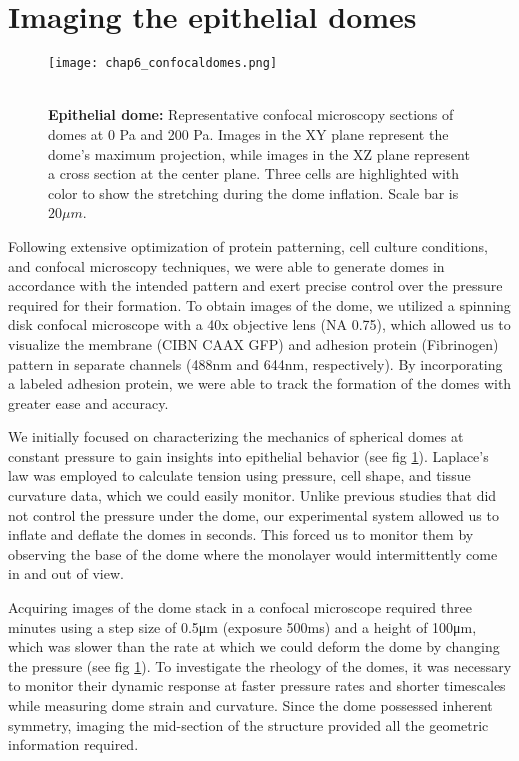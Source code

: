 \hypertarget{imaging-the-epithelial-domes}{%
\section{Imaging the epithelial
domes}\label{imaging-the-epithelial-domes}}

\begin{figure}[b!]
	\centering
	\texttt{[image: chap6\_confocaldomes.png]}
	\caption{\\ \textbf{Epithelial dome:} Representative confocal microscopy sections of domes at 0 Pa and 200 Pa. Images in the XY plane represent the dome's maximum projection, while images in the XZ plane represent a cross section at the center plane. Three cells are highlighted with color to show the stretching during the dome inflation. Scale bar is $20 \mu m$.
	} \label{fig_6_6}
\end{figure}

Following extensive optimization of protein patterning, cell culture conditions, and confocal microscopy techniques, we were able to generate domes in accordance with the intended pattern and exert precise control over the pressure required for their formation. To obtain images of the dome, we utilized a spinning disk confocal microscope with a 40x objective lens (NA 0.75), which allowed us to visualize the membrane (CIBN CAAX GFP) and adhesion protein (Fibrinogen) pattern in separate channels (488\unit{\nm} and 644\unit{\nm}, respectively). By incorporating a labeled adhesion protein, we were able to track the formation of the domes with greater ease and accuracy.

We initially focused on characterizing the mechanics of spherical domes at constant pressure to gain insights into epithelial behavior (see fig \ref{fig_6_6}). Laplace's law was employed to calculate tension using pressure, cell shape, and tissue curvature data, which we could easily monitor. Unlike previous studies that did not control the pressure under the dome, our experimental system allowed us to inflate and deflate the domes in seconds. This forced us to monitor them by observing the base of the dome where the monolayer would intermittently come in and out of view.

\vspace{2em}

Acquiring images of the dome stack in a confocal microscope required three minutes using a step size of 0.5\unit{\um} (exposure 500\unit{\ms}) and a height of 100\unit{\um}, which was slower than the rate at which we could deform the dome by changing the pressure (see fig \ref{fig_6_6}). To investigate the rheology of the domes, it was necessary to monitor their dynamic response at faster pressure rates and shorter timescales while measuring dome strain and curvature. Since the dome possessed inherent symmetry, imaging the mid-section of the structure provided all the geometric information required.


